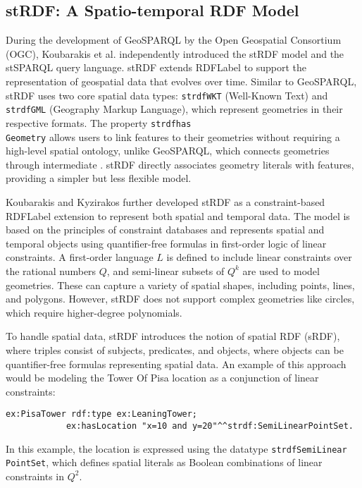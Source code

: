\subsection{stRDF: A Spatio-temporal RDF Model}\label{III-subsec:strdf}

During the development of GeoSPARQL by the Open Geospatial Consortium (OGC), Koubarakis et al. \cite{koubarakisModelingQueryingMetadata2010a} independently introduced the stRDF model and the stSPARQL query language. stRDF extends \acrshort{RDFLabel} to support the representation of geospatial data that evolves over time. Similar to GeoSPARQL, stRDF uses two core spatial data types: \texttt{\gls{strdf}WKT} (Well-Known Text) and \texttt{\gls{strdf}GML} (Geography Markup Language), which represent geometries in their respective formats. The property \texttt{\gls{strdf}has\\Geometry} allows users to link features to their geometries without requiring a high-level spatial ontology, unlike GeoSPARQL, which connects geometries through intermediate . stRDF directly associates geometry literals with features, providing a simpler but less flexible model.

Koubarakis and Kyzirakos further developed stRDF as a constraint-based \acrshort{RDFLabel} extension to represent both spatial and temporal data. The model is based on the principles of constraint databases and represents spatial and temporal objects using quantifier-free formulas in first-order logic of linear constraints. A first-order language \( L \) is defined to include linear constraints over the rational numbers \( Q \), and semi-linear subsets of \( Q^k \) are used to model geometries. These can capture a variety of spatial shapes, including points, lines, and polygons. However, stRDF does not support complex geometries like circles, which require higher-degree polynomials.

To handle spatial data, stRDF introduces the notion of spatial RDF (sRDF), where triples consist of subjects, predicates, and objects, where objects can be quantifier-free formulas representing spatial data. An example of this approach would be modeling the Tower Of Pisa location as a conjunction of linear constraints:
\begin{lstlisting}[caption=the Tower of Pisa location as a conjunction of linear constraints, label={lst:tower-Pisa-location}]
ex:PisaTower rdf:type ex:LeaningTower;
            ex:hasLocation "x=10 and y=20"^^strdf:SemiLinearPointSet.
\end{lstlisting}
In this example, the location is expressed using the datatype \texttt{\gls{strdf}SemiLinear\\PointSet}, which defines spatial literals as Boolean combinations of linear constraints in \( Q^2 \).

